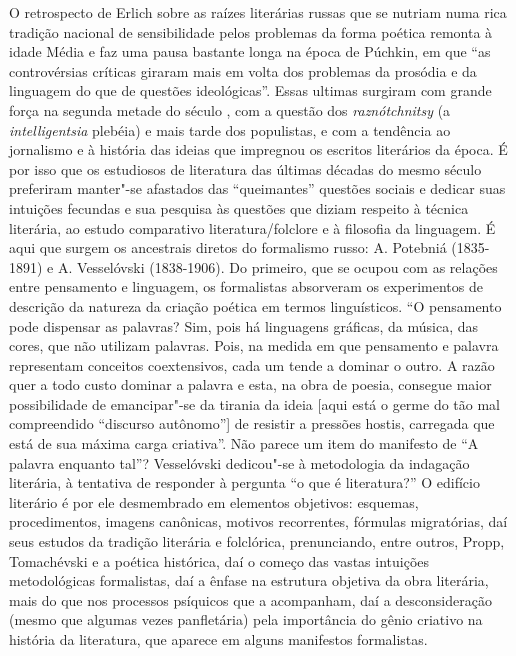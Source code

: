 O retrospecto de Erlich sobre as raízes literárias russas que se nutriam
numa rica tradição nacional de sensibilidade pelos problemas da forma
poética remonta à idade Média e faz uma pausa bastante longa na época de
Púchkin, em que ``as controvérsias críticas giraram mais em volta dos
problemas da prosódia e da linguagem do que de questões ideológicas''.
Essas ultimas surgiram com grande força na segunda metade do século ,
com a questão dos \emph{raznótchnitsy} (a \emph{intelligentsia} plebéia)
e mais tarde dos populistas, e com a tendência ao jornalismo e à
história das ideias que impregnou os escritos literários da época. É por
isso que os estudiosos de literatura das últimas décadas do mesmo século
preferiram manter"-se afastados das ``queimantes'' questões sociais e
dedicar suas intuições fecundas e sua pesquisa às questões que diziam
respeito à técnica literária, ao estudo comparativo literatura/folclore
e à filosofia da linguagem. É aqui que surgem os ancestrais diretos do
formalismo russo: A. Potebniá (1835-1891) e A. Vesselóvski (1838-1906).
Do primeiro, que se ocupou com as relações entre pensamento e linguagem,
os formalistas absorveram os experimentos de descrição da natureza da
criação poética em termos linguísticos. ``O pensamento pode dispensar as
palavras? Sim, pois há linguagens gráficas, da música, das cores, que
não utilizam palavras. Pois, na medida em que pensamento e palavra
representam conceitos coextensivos, cada um tende a dominar o outro. A
razão quer a todo custo dominar a palavra e esta, na obra de poesia,
consegue maior possibilidade de emancipar"-se da tirania da ideia {[}aqui
está o germe do tão mal compreendido ``discurso autônomo''{]} de
resistir a pressões hostis, carregada que está de sua máxima carga
criativa''. Não parece um item do manifesto de ``A palavra enquanto
tal''? Vesselóvski dedicou"-se à metodologia da indagação literária, à
tentativa de responder à pergunta ``o que é literatura?'' O edifício
literário é por ele desmembrado em elementos objetivos: esquemas,
procedimentos, imagens canônicas, motivos recorrentes, fórmulas
migratórias, daí seus estudos da tradição literária e folclórica,
prenunciando, entre outros, Propp, Tomachévski e a poética histórica,
daí o começo das vastas intuições metodológicas formalistas, daí a
ênfase na estrutura objetiva da obra literária, mais do que nos
processos psíquicos que a acompanham, daí a desconsideração (mesmo que
algumas vezes panfletária) pela importância do gênio criativo na
história da literatura, que aparece em alguns manifestos formalistas.

